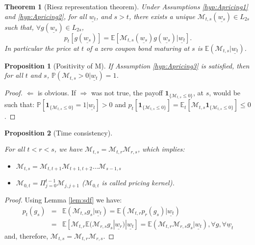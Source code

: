 \documentclass[
  12pt,
]{book}
\providecommand{\tightlist}{%
  \setlength{\itemsep}{0pt}\setlength{\parskip}{0pt}}
\newtheorem{theorem}{Theorem}[chapter]
\newtheorem{proposition}{Proposition}[chapter]
\theoremstyle{definition}
\theoremstyle{definition}
\theoremstyle{definition}
\theoremstyle{definition}
\theoremstyle{remark}
\begin{document}
\begin{theorem}[Riesz representation theorem]
\protect\hypertarget{thm:Riesz}{}\label{thm:Riesz}Under Assumptions \ref{hyp:Apricing1} and \ref{hyp:Apricing2}, for all \(\underline{w_t}\), and \(s > t\), there exists a unique \(\mathcal{M}_{t,s}(\underline{w_s}) \in L_{2s}\) such that, \(\forall g(\underline{w_s}) \in L_{2s}\),
\[
p_t[g(\underline{w_s})] = \mathbb{E}[\mathcal{M}_{t,s}(\underline{w_s})g(\underline{w_s})|\underline{w_t}].
\]
In particular the price at \(t\) of a zero coupon bond maturing at \(s\) is \(\mathbb{E}(\mathcal{M}_{t,s}|\underline{w_t})\).
\end{theorem}

\begin{proposition}[Positivity of M]
\protect\hypertarget{prp:PositivityM}{}\label{prp:PositivityM}If Assumption \ref{hyp:Apricing3} is satisfied, then for all \(t\) and \(s\), \(\mathbb{P}(\mathcal{M}_{t,s}>0|\underline{w_t})=1\).
\end{proposition}

\begin{proof}
\(\Leftarrow\) is obvious. If \(\Rightarrow\) was not true, the payoff
\(\textbf{1}_{\{\mathcal{M}_{t,s} \le 0\}}\), at \(s\), would be such that:
\(\mathbb{P}[\textbf{1}_{\{\mathcal{M}_{t,s} \le 0\}}=1|\underline{w_t}] > 0\) and \(p_t[\textbf{1}_{\{\mathcal{M}_{t,s} \le 0\}}] = \mathbb{E}_t[\mathcal{M}_{t,s}\textbf{1}_{\{\mathcal{M}_{t,s} \le 0\}}] \le 0\).
\end{proof}

\begin{proposition}[Time consistency]
\protect\hypertarget{prp:timeconsist}{}\label{prp:timeconsist}

For all \(t < r < s\), we have \(\mathcal{M}_{t,s} = \mathcal{M}_{t,r} \mathcal{M}_{r,s}\), which implies:

\begin{itemize}
\tightlist
\item
  \(\mathcal{M}_{t,s} = \mathcal{M}_{t,t+1} \mathcal{M}_{t+1,t+2}\dots\mathcal{M}_{s-1,s}\)
\item
  \(\mathcal{M}_{0,t} = \Pi^{t-1}_{j=0} \mathcal{M}_{j,j+1}\) (\(\mathcal{M}_{0,t}\) is called \emph{pricing kernel}).
\end{itemize}

\end{proposition}

\begin{proof}
Using Lemma \ref{lem:sdf} we have:
\begin{eqnarray*}
p_t(g_s) &=& \mathbb{E}(\mathcal{M}_{t,s}g_s|\underline{w_t}) = \mathbb{E}(\mathcal{M}_{t,r} p_r(g_s)|\underline{w_t}) \\
&=& \mathbb{E}[\mathcal{M}_{t,r}\mathbb{E}(\mathcal{M}_{r,s} g_s|\underline{w_r})|\underline{w_t}] = \mathbb{E}(\mathcal{M}_{t,r} \mathcal{M}_{r,s} g_s|\underline{w_t}), \forall g, \forall \underline{w}_{t}
\end{eqnarray*}
and, therefore, \(\mathcal{M}_{t,s} = \mathcal{M}_{t,r}\mathcal{M}_{r,s}\).
\end{proof}
\end{document}
